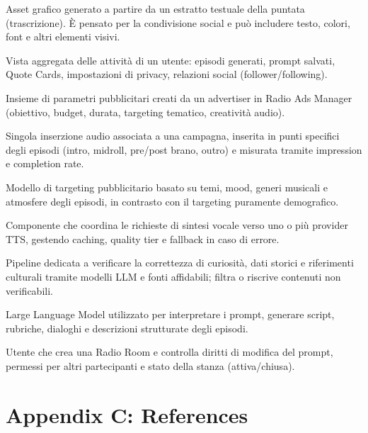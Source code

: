 \documentclass[11pt,a4paper]{article}
\begin{document}
\begin{description}[leftmargin=!,labelwidth=3cm]
    \item[Quote Card] Asset grafico generato a partire da un estratto testuale della puntata (trascrizione). È pensato per la condivisione social e può includere testo, colori, font e altri elementi visivi.
    
    \item[Profilo Utente] Vista aggregata delle attività di un utente: episodi generati, prompt salvati, Quote Cards, impostazioni di privacy, relazioni social (follower/following).
    
    \item[Campagna / Campaign] Insieme di parametri pubblicitari creati da un advertiser in Radio Ads Manager (obiettivo, budget, durata, targeting tematico, creatività audio).
    
    \item[Spot / Ad Spot] Singola inserzione audio associata a una campagna, inserita in punti specifici degli episodi (intro, midroll, pre/post brano, outro) e misurata tramite impression e completion rate.
    
    \item[Targeting Tematico] Modello di targeting pubblicitario basato su temi, mood, generi musicali e atmosfere degli episodi, in contrasto con il targeting puramente demografico.
    
    \item[TTS Orchestrator] Componente che coordina le richieste di sintesi vocale verso uno o più provider TTS, gestendo caching, quality tier e fallback in caso di errore.
    
    \item[Fact-Checking Engine] Pipeline dedicata a verificare la correttezza di curiosità, dati storici e riferimenti culturali tramite modelli LLM e fonti affidabili; filtra o riscrive contenuti non verificabili.
    
    \item[LLM] Large Language Model utilizzato per interpretare i prompt, generare script, rubriche, dialoghi e descrizioni strutturate degli episodi.
    
    \item[Room Host] Utente che crea una Radio Room e controlla diritti di modifica del prompt, permessi per altri partecipanti e stato della stanza (attiva/chiusa).
\end{description}

\section{Appendix C: References}
\label{appendix:references}
\end{document}
